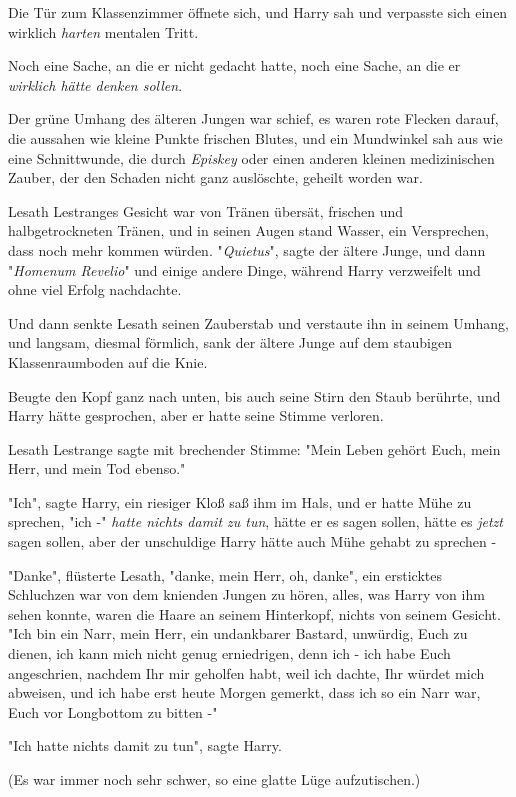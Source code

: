 {Die Tür zum Klassenzimmer öffnete sich, und Harry sah und verpasste sich einen wirklich \emph{harten} mentalen Tritt.

Noch eine Sache, an die er nicht gedacht hatte, noch eine Sache, an die er \emph{wirklich hätte denken sollen}.

Der grüne Umhang des älteren Jungen war schief, es waren rote Flecken darauf, die aussahen wie kleine Punkte frischen Blutes, und ein Mundwinkel sah aus wie eine Schnittwunde, die durch \emph{Episkey} oder einen anderen kleinen medizinischen Zauber, der den Schaden nicht ganz auslöschte, geheilt worden war.

Lesath Lestranges Gesicht war von Tränen übersät, frischen und halbgetrockneten Tränen, und in seinen Augen stand Wasser, ein Versprechen, dass noch mehr kommen würden. "\emph{Quietus}", sagte der ältere Junge, und dann "\emph{Homenum Revelio}" und einige andere Dinge, während Harry verzweifelt und ohne viel Erfolg nachdachte.

Und dann senkte Lesath seinen Zauberstab und verstaute ihn in seinem Umhang, und langsam, diesmal förmlich, sank der ältere Junge auf dem staubigen Klassenraumboden auf die Knie.

Beugte den Kopf ganz nach unten, bis auch seine Stirn den Staub berührte, und Harry hätte gesprochen, aber er hatte seine Stimme verloren.

Lesath Lestrange sagte mit brechender Stimme: "Mein Leben gehört Euch, mein Herr, und mein Tod ebenso."

"Ich", sagte Harry, ein riesiger Kloß saß ihm im Hals, und er hatte Mühe zu sprechen, "ich -" \emph{hatte nichts damit zu tun}, hätte er es sagen sollen, hätte es \emph{jetzt} sagen sollen, aber der unschuldige Harry hätte auch Mühe gehabt zu sprechen -

"Danke", flüsterte Lesath, "danke, mein Herr, oh, danke", ein ersticktes Schluchzen war von dem knienden Jungen zu hören, alles, was Harry von ihm sehen konnte, waren die Haare an seinem Hinterkopf, nichts von seinem Gesicht. "Ich bin ein Narr, mein Herr, ein undankbarer Bastard, unwürdig, Euch zu dienen, ich kann mich nicht genug erniedrigen, denn ich - ich habe Euch angeschrien, nachdem Ihr mir geholfen habt, weil ich dachte, Ihr würdet mich abweisen, und ich habe erst heute Morgen gemerkt, dass ich so ein Narr war, Euch vor Longbottom zu bitten -"

"Ich hatte nichts damit zu tun", sagte Harry.

(Es war immer noch sehr schwer, so eine glatte Lüge aufzutischen.)

}

